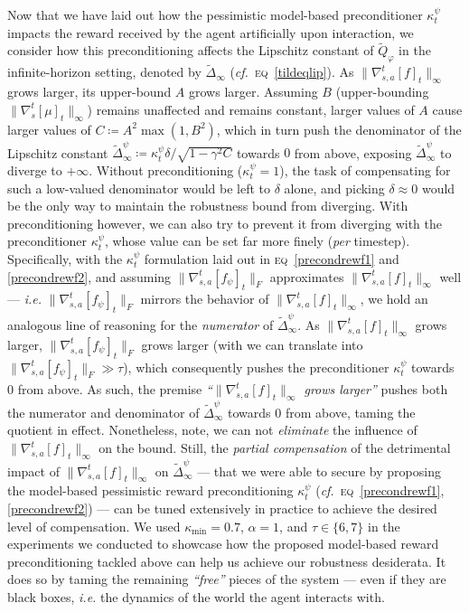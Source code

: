 Now that we have laid out how the pessimistic model-based preconditioner $\kappa_t^\psi$ impacts the reward
received by the agent artificially upon interaction, we consider how this preconditioning affects the
Lipschitz constant of $\widetilde{Q}_\varphi$ in the infinite-horizon setting,
denoted by $\widetilde{\Delta}_\infty$ (\textit{cf.}~\textsc{eq}~\ref{tildeqlip}).
As $\lVert\nabla_{s,a}^t[f]_t\rVert _\infty$ grows larger,
its upper-bound $A$ grows larger.
Assuming $B$ (upper-bounding $\lVert\nabla_s^t[\mu]_t\rVert _\infty$) remains unaffected and remains constant,
larger values of $A$ cause larger values of $C \coloneqq A^2 \max(1, B^2)$,
which in turn push the denominator of the Lipschitz constant
$\widetilde{\Delta}_\infty^\psi \coloneqq \kappa_t^\psi \delta / \sqrt{1 - \gamma^2 C}$
towards $0$ from above,
exposing $\widetilde{\Delta}_\infty^\psi$ to diverge to $+\infty$.
Without preconditioning
($\kappa_t^\psi = 1$),
the task of compensating for such a low-valued denominator would be left to $\delta$ alone,
and picking $\delta \approx 0$ would be the only way to maintain the robustness bound from diverging.
With preconditioning however, we can also try to prevent it from diverging with
the preconditioner $\kappa_t^\psi$, whose value can be set far more finely (\emph{per} timestep).
Specifically, with the $\kappa_t^\psi$ formulation laid out in \textsc{eq}~\ref{precondrewf1} and \ref{precondrewf2},
and assuming $\lVert\nabla_{s,a}^t[f_\psi]_t\rVert _F$ approximates
$\lVert\nabla_{s,a}^t[f]_t\rVert _\infty$ well
--- \textit{i.e.} $\lVert\nabla_{s,a}^t[f_\psi]_t\rVert _F$
mirrors the behavior of $\lVert\nabla_{s,a}^t[f]_t\rVert _\infty$,
we hold an analogous line of reasoning for the \emph{numerator} of $\widetilde{\Delta}_\infty^\psi$.
As $\lVert\nabla_{s,a}^t[f]_t\rVert _\infty$ grows larger,
$\lVert\nabla_{s,a}^t[f_\psi]_t\rVert _F$ grows larger
(with we can translate into $\lVert\nabla_{s,a}^t[f_\psi]_t\rVert _F \gg \tau$),
which consequently pushes the preconditioner $\kappa_t^\psi$
towards $0$ from above.
As such, the premise \textit{``$\lVert\nabla_{s,a}^t[f]_t\rVert _\infty$ grows larger''}
pushes both the numerator and denominator of $\widetilde{\Delta}_\infty^\psi$ towards $0$ from above,
taming the quotient in effect.
Nonetheless, note, we can not \emph{eliminate} the influence of $\lVert\nabla_{s,a}^t[f]_t\rVert _\infty$ on the bound.
Still, the \emph{partial compensation} of the detrimental impact
of $\lVert\nabla_{s,a}^t[f]_t\rVert _\infty$ on $\widetilde{\Delta}_\infty^\psi$ ---
that we were able to secure by proposing the model-based pessimistic reward preconditioning $\kappa_t^\psi$
(\textit{cf.}~\textsc{eq}~\ref{precondrewf1}, \ref{precondrewf2}) ---
can be tuned extensively in practice
to achieve the desired level of compensation.
We used $\kappa_\text{min} = 0.7$, $\alpha = 1$, and $\tau \in \{6,7\}$ in the experiments
we conducted to showcase how the proposed model-based reward preconditioning tackled above can help us
achieve our robustness desiderata. It does so by taming the remaining \textit{``free''} pieces of the system ---
even if they are black boxes, \textit{i.e.} the dynamics of the world the agent interacts with.

